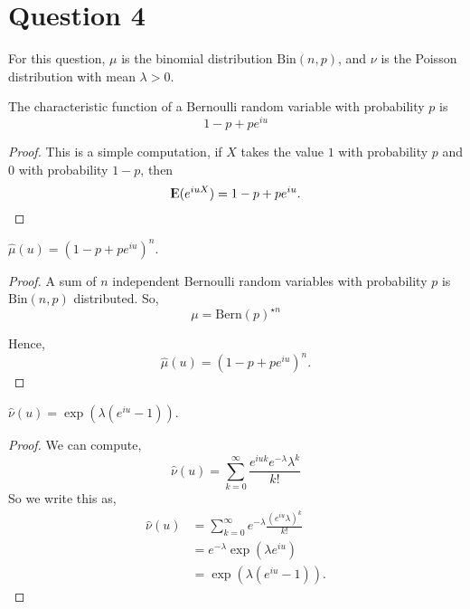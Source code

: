 \documentclass{unswmaths}
\begin{document}
\section*{Question 4}
For this question, $\mu$ is the binomial distribution $\mathrm{Bin}(n,p)$,
and $\nu$ is the Poisson distribution with mean $\lambda > 0$.

\begin{lemma}
    The characteristic function of a Bernoulli random variable
    with probability $p$ is
    \begin{equation*}
        1-p+pe^{iu}
    \end{equation*}
\end{lemma}
\begin{proof}
    This is a simple computation, if $X$ takes the value $1$ with probability
    $p$ and $0$ with probability $1-p$, then
    \begin{equation*}
        {\rm I\kern-.3em E}(e^{iuX}) = 1-p+pe^{iu}.
    \end{equation*}
\end{proof}
\begin{lemma}
    $\hat{\mu}(u) = (1-p+pe^{iu})^n$.
\end{lemma}
\begin{proof}
    A sum of $n$ independent Bernoulli random variables with
    probability $p$ is $\mathrm{Bin}(n,p)$ distributed. So,
    \begin{equation*}
        {\mu} = {\mathrm{Bern}(p)}^{\star n}
    \end{equation*}
    
    Hence,
    \begin{equation*}
        \hat{\mu}(u) = (1-p+pe^{iu})^n.
    \end{equation*}
\end{proof}



\begin{lemma}
    $\hat{\nu}(u) = \exp(\lambda(e^{iu}-1))$.
\end{lemma}
\begin{proof}
    We can compute,
    \begin{equation*}
        \hat{\nu}(u) = \sum_{k=0}^\infty \frac{e^{iuk}e^{-\lambda}\lambda^k}{k!}
    \end{equation*}
    So we write this as,
    \begin{align*}
        \hat{\nu}(u) &= \sum_{k=0}^\infty e^{-\lambda} \frac{(e^{iu}\lambda)^k}{k!}\\
        &= e^{-\lambda} \exp(\lambda e^{iu})\\
        &= \exp(\lambda(e^{iu}-1)).
    \end{align*}
\end{proof}
\end{document}
